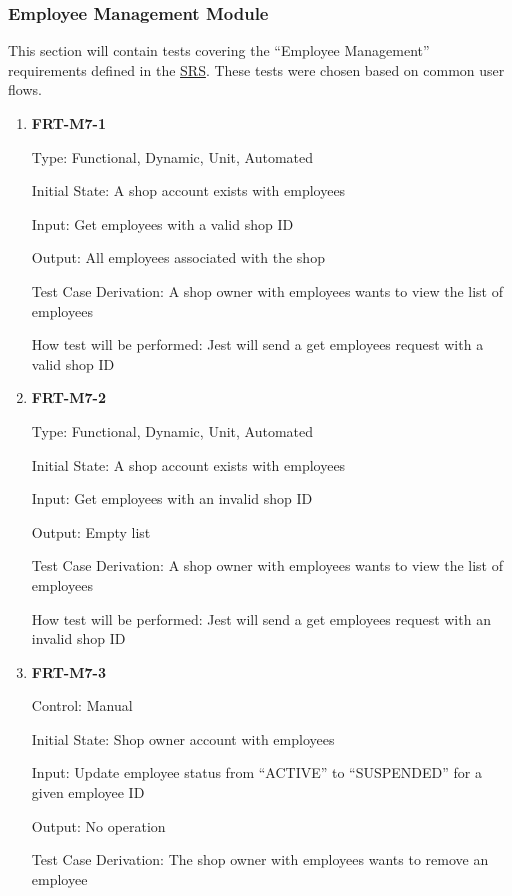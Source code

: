 \documentclass[12pt, titlepage]{article}
\begin{document}
\subsubsection{Employee Management Module}

This section will contain tests covering the ``Employee Management'' requirements defined in the
\href{https://github.com/arkinmodi/project-sayyara/blob/main/docs/SRS/SRS.pdf}{SRS}. These tests
were chosen based on common user flows.

\begin{enumerate}

	\item \textbf{FRT-M7-1}

	      Type: Functional, Dynamic, Unit, Automated

	      Initial State: A shop account exists with employees

	      Input: Get employees with a valid shop ID

	      Output: All employees associated with the shop

	      Test Case Derivation: A shop owner with employees wants to view the list of employees

	      How test will be performed: Jest will send a get employees request with a valid shop ID

	\item \textbf{FRT-M7-2}

	      Type: Functional, Dynamic, Unit, Automated

	      Initial State: A shop account exists with employees

	      Input: Get employees with an invalid shop ID

	      Output: Empty list

	      Test Case Derivation: A shop owner with employees wants to view the list of employees

	      How test will be performed: Jest will send a get employees request with an invalid shop ID

	\item \textbf{FRT-M7-3}

	      Control: Manual

	      Initial State: Shop owner account with employees

	      Input: Update employee status from ``ACTIVE'' to ``SUSPENDED'' for a given employee ID

	      Output: No operation

	      Test Case Derivation: The shop owner with employees wants to remove an employee


\end{enumerate}
\end{document}
